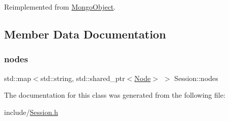 Reimplemented from \hyperlink{class_mongo_object_a65971bad07dce8b649820f9dee5d0ae8}{Mongo\+Object}.



\subsection{Member Data Documentation}
\mbox{\label{class_session_a0b50e79f5e66081dd5112571107bc652}} 
\subsubsection{\texorpdfstring{nodes}{nodes}}
{\footnotesize\ttfamily std\+::map$<$std\+::string, std\+::shared\+\_\+ptr$<$\hyperlink{class_node}{Node}$>$ $>$ Session\+::nodes}



The documentation for this class was generated from the following file\+:\begin{DoxyCompactItemize}
\item 
include/\hyperlink{_session_8h}{Session.\+h}\end{DoxyCompactItemize}
